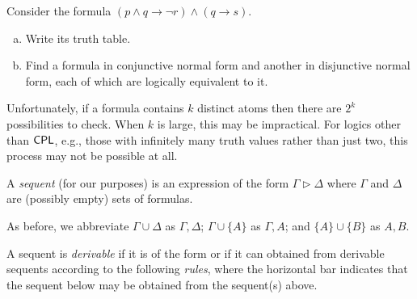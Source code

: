 \documentclass{article}
\begin{document}
\begin{prob}{3.1}
    Consider the formula $(p \wedge q \to \neg r) \wedge (q \to s)$.
    \begin{enumerate}[a)]
        \item Write its truth table.
        \item Find a formula in conjunctive normal form and another in disjunctive normal form, each of which are logically equivalent to it.
    \end{enumerate}
\end{prob}

Unfortunately, if a formula contains $k$ distinct atoms then there are $2^k$ possibilities to check. When $k$ is large, this may be impractical. For logics other than $\mathsf{CPL}$, e.g., those with infinitely many truth values rather than just two, this process may not be possible at all.

\begin{definition}
    A \emph{sequent} (for our purposes) is an expression of the form $\Gamma \triangleright \Delta$ where $\Gamma$ and $\Delta$ are (possibly empty) sets of formulas.
\end{definition}

\begin{notation} 
    As before, we abbreviate $\Gamma \cup \Delta$ as $\Gamma, \Delta$; $\Gamma \cup \{ A \}$ as $\Gamma, A$; and $\{ A \} \cup \{ B \}$ as $A, B$.
\end{notation}

\begin{definition}
    A sequent is \emph{derivable} if it is of the form  or if it can obtained from derivable sequents according to the following \emph{rules}, where the horizontal bar indicates that the sequent below may be obtained from the sequent(s) above.
\end{definition}
\end{document}
